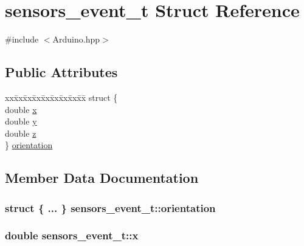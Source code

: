 \hypertarget{structsensors__event__t}{}\section{sensors\+\_\+event\+\_\+t Struct Reference}
\label{structsensors__event__t}


{\ttfamily \#include $<$Arduino.\+hpp$>$}

\subsection*{Public Attributes}
\begin{DoxyCompactItemize}
\item 
\begin{tabbing}
xx\=xx\=xx\=xx\=xx\=xx\=xx\=xx\=xx\=\kill
struct \{\\
\>double \hyperlink{structsensors__event__t_a07c57c4ba0891e94454d1a3a12a1b221}{x}\\
\>double \hyperlink{structsensors__event__t_a2a3da084726c159c7330ff1f6069afbc}{y}\\
\>double \hyperlink{structsensors__event__t_aec4b79cc80a3a3490735e76e30d7132f}{z}\\
\} \hyperlink{structsensors__event__t_a8d961ca1853f7c1208349d3273a3dc6c}{orientation}\\

\end{tabbing}\end{DoxyCompactItemize}


\subsection{Member Data Documentation}
\subsubsection[{\texorpdfstring{orientation}{orientation}}]{\setlength{\rightskip}{0pt plus 5cm}struct \{ ... \}   sensors\+\_\+event\+\_\+t\+::orientation}\hypertarget{structsensors__event__t_a8d961ca1853f7c1208349d3273a3dc6c}{}\label{structsensors__event__t_a8d961ca1853f7c1208349d3273a3dc6c}
\subsubsection[{\texorpdfstring{x}{x}}]{\setlength{\rightskip}{0pt plus 5cm}double sensors\+\_\+event\+\_\+t\+::x}\hypertarget{structsensors__event__t_a07c57c4ba0891e94454d1a3a12a1b221}{}\label{structsensors__event__t_a07c57c4ba0891e94454d1a3a12a1b221}
